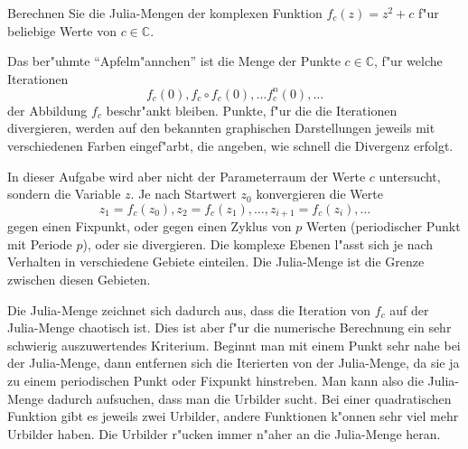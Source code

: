 \begin{aufgabe}
Berechnen Sie die Julia-Mengen der komplexen Funktion $f_c(z)=z^2+c$ f"ur
beliebige Werte von $c\in\mathbb C$.
\end{aufgabe}

Das ber"uhmte ``Apfelm"annchen'' ist die Menge der Punkte $c\in\mathbb C$,
f"ur welche Iterationen
\[
f_c(0), f_c\circ f_c(0), \dots f_c^n(0),\dots
\]
der Abbildung $f_c$ beschr"ankt bleiben.
Punkte, f"ur die die Iterationen divergieren, werden auf den bekannten
graphischen Darstellungen jeweils mit verschiedenen Farben eingef"arbt,
die angeben, wie schnell die Divergenz erfolgt.

In dieser Aufgabe wird aber nicht der Parameterraum der Werte $c$
untersucht, sondern die Variable $z$.
Je nach Startwert $z_0$ konvergieren die Werte 
\[
z_1=f_c(z_0), z_2=f_c(z_1),\dots,z_{i+1}=f_c(z_i),\dots
\]
gegen einen Fixpunkt, oder gegen einen Zyklus von $p$ Werten (periodischer
Punkt mit Periode $p$), oder sie divergieren.
Die komplexe Ebenen l"asst sich je nach Verhalten in verschiedene
Gebiete einteilen. Die Julia-Menge ist die Grenze zwischen diesen
Gebieten.

Die Julia-Menge zeichnet sich dadurch aus, dass die Iteration von $f_c$ auf
der Julia-Menge chaotisch ist.
Dies ist aber f"ur die numerische Berechnung ein sehr schwierig auszuwertendes
Kriterium.
Beginnt man mit einem Punkt sehr nahe bei der Julia-Menge,
dann entfernen sich die Iterierten von der Julia-Menge,
da sie ja zu einem periodischen Punkt oder Fixpunkt hinstreben.
Man kann also die Julia-Menge dadurch aufsuchen, dass man die Urbilder sucht.
Bei einer quadratischen Funktion gibt es jeweils zwei Urbilder,
andere Funktionen k"onnen sehr viel mehr Urbilder haben. Die Urbilder
r"ucken immer n"aher an die Julia-Menge heran.


